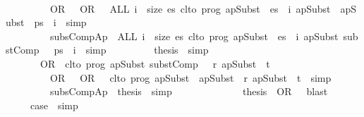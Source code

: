 \documentclass{llncs}
\newenvironment{isacode}
{\begin{list}{}{
\setlength{\leftmargin}{4pt}
\setlength{\rightmargin}{0pt}
\setlength{\listparindent}{0pt}\raggedright
\setlength{\itemsep}{0pt}
\setlength{\parsep}{0pt}
\normalfont\ttfamily }\item[]}
{\end{list}}
\begin{document}
{\begin{isacode}
\ \ \ \ \ \ \isamarkupfalse \ {\isacharminus}\isanewline
\ \ \ \ \ \ \ \ \isamarkupfalse \ OR\ {\isacharparenleft}{}{\isacharparenright}\ \ OR\ {\isacharparenleft}{}{\isacharparenright}\ \isamarkupfalse \ {\isachardoublequoteopen}ALL\ i\ {\isacharless}\ size\ es{\isachardot}\ clto\ prog\ {\isacharparenleft}apSubst\ {\isasymtheta}\ {\isacharparenleft}es\ {\isacharbang}\ i{\isacharparenright}{\isacharparenright}\ {\isacharparenleft}apSubst\ {\isasymtheta}\ {\isacharparenleft}apSubst\ {\isasymmu}\ {\isacharparenleft}ps\ {\isacharbang}\ i{\isacharparenright}{\isacharparenright}{\isacharparenright}{\isachardoublequoteclose}\ \isamarkupfalse \ simp\isanewline
\ \ \ \ \ \ \ \ \isamarkupfalse \ subsCompAp\ \isamarkupfalse \ {\isachardoublequoteopen}ALL\ i\ {\isacharless}\ size\ es{\isachardot}\ clto\ prog\ {\isacharparenleft}apSubst\ {\isasymtheta}\ {\isacharparenleft}es\ {\isacharbang}\ i{\isacharparenright}{\isacharparenright}\ {\isacharparenleft}apSubst\ {\isacharparenleft}substComp\ {\isasymtheta}\ {\isasymmu}{\isacharparenright}\ {\isacharparenleft}ps\ {\isacharbang}\ i{\isacharparenright}{\isacharparenright}{\isachardoublequoteclose}\ \isamarkupfalse \ simp\isanewline
\ \ \ \ \ \ \ \ \isamarkupfalse \ {\isacharquery}thesis\ \isamarkupfalse \ simp\isanewline
\ \ \ \ \ \ \isamarkupfalse \isanewline
\ \ \ \ \ \isamarkupfalse \isanewline
\ \ \ \ \ \ \isamarkupfalse \ OR\ \isamarkupfalse \ {\isachardoublequoteopen}clto\ prog\ {\isacharparenleft}apSubst\ {\isacharparenleft}substComp\ {\isasymtheta}\ {\isasymmu}{\isacharparenright}\ r{\isacharparenright}\ {\isacharparenleft}apSubst\ {\isasymtheta}\ t{\isacharparenright}{\isachardoublequoteclose}\isanewline
\ \ \ \ \ \ \isamarkupfalse \ {\isacharminus}\isanewline
\ \ \ \ \ \ \ \ \isamarkupfalse \ OR\ {\isacharparenleft}{}{\isacharparenright}\ \ OR\ {\isacharparenleft}{}{\isacharparenright}\ \isamarkupfalse \ {\isachardoublequoteopen}clto\ prog\ {\isacharparenleft}apSubst\ {\isasymtheta}\ {\isacharparenleft}apSubst\ {\isasymmu}\ r{\isacharparenright}{\isacharparenright}\ {\isacharparenleft}apSubst\ {\isasymtheta}\ t{\isacharparenright}{\isachardoublequoteclose}\ \isamarkupfalse \ simp\isanewline
\ \ \ \ \ \ \ \ \isamarkupfalse \ subsCompAp\ \isamarkupfalse \ {\isacharquery}thesis\ \isamarkupfalse \ simp\isanewline
\ \ \ \ \ \ \isamarkupfalse \isanewline
\ \ \ \ \ \isamarkupfalse \ \isamarkupfalse \ {\isacharquery}thesis\ \isamarkupfalse \ OR\ {\isacharparenleft}{}{\isacharparenright}\ \isamarkupfalse \ blast\isanewline
\ \ \ \ \isamarkupfalse \isanewline
\ \ \ \ \isamarkupfalse \ {\isacharquery}case\ \isamarkupfalse \ simp\isanewline
{}\isamarkupfalse \endisatagproof
{\isafoldproof}\end{isacode}}{}
\end{document}
